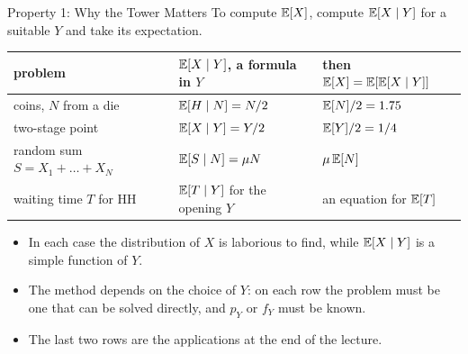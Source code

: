 \begin{frame}{Property 1: Why the Tower Matters}
  \small
  To compute $\mathbb{E}[X]$, compute $\mathbb{E}[X\mid Y]$ for a suitable $Y$ and take its expectation.
  \begin{center}
    \renewcommand{\arraystretch}{1.4}
    \begin{tabular}{@{}lll@{}}
      \toprule
      problem & $\mathbb{E}[X\mid Y]$, a formula in $Y$ & then $\mathbb{E}[X]=\mathbb{E}[\mathbb{E}[X\mid Y]]$ \\
      \midrule
      coins, $N$ from a die & $\mathbb{E}[H\mid N]=N/2$ & $\mathbb{E}[N]/2=1.75$ \\
      two-stage point & $\mathbb{E}[X\mid Y]=Y/2$ & $\mathbb{E}[Y]/2=1/4$ \\
      random sum $S=X_1+\dots+X_N$ & $\mathbb{E}[S\mid N]=\mu N$ & $\mu\,\mathbb{E}[N]$ \\
      waiting time $T$ for HH & $\mathbb{E}[T\mid Y]$ for the opening $Y$ & an equation for $\mathbb{E}[T]$ \\
      \bottomrule
    \end{tabular}
  \end{center}
  \begin{itemize}
    \item In each case the distribution of $X$ is laborious to find, while $\mathbb{E}[X\mid Y]$ is a simple function of $Y$.
    \item The method depends on the choice of $Y$: on each row the problem must be one that can be solved directly, and $p_Y$ or $f_Y$ must be known.
    \item The last two rows are the applications at the end of the lecture.
  \end{itemize}
\end{frame}

